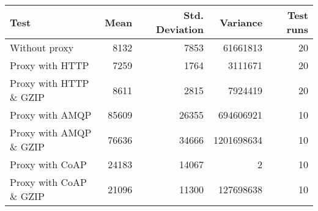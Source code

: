 \begin{tabular}{lrrrr}
\hline
 Test                   &   Mean &   Std. Deviation &   Variance &   Test runs \\
\hline
 Without proxy          &   8132 &             7853 &   61661813 &          20 \\
 Proxy with HTTP        &   7259 &             1764 &    3111671 &          20 \\
 Proxy with HTTP \& GZIP &   8611 &             2815 &    7924419 &          20 \\
 Proxy with AMQP        &  85609 &            26355 &  694606921 &          10 \\
 Proxy with AMQP \& GZIP &  76636 &            34666 & 1201698634 &          10 \\
 Proxy with CoAP        &  24183 &            14067 &          2 &          10 \\
 Proxy with CoAP \& GZIP &  21096 &            11300 &  127698638 &          10 \\
\hline
\end{tabular}